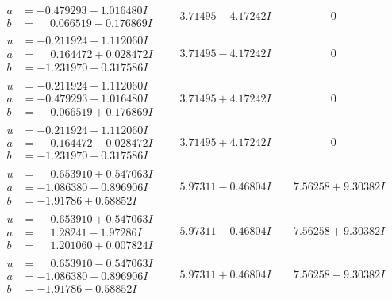 \documentclass[1p]{elsarticle_modified}
\theoremstyle{definition}
\begin{document}
$$\begin{array}{c|c|c}
\begin{aligned}
a &= -0.479293 - 1.016480 I \\
b &= \phantom{-}0.066519 - 0.176869 I\end{aligned}
 & \phantom{-}3.71495 - 4.17242 I & \phantom{-0.000000 } 0 \\ \hline\begin{aligned}
u &= -0.211924 + 1.112060 I \\
a &= \phantom{-}0.164472 + 0.028472 I \\
b &= -1.231970 + 0.317586 I\end{aligned}
 & \phantom{-}3.71495 - 4.17242 I & \phantom{-0.000000 } 0 \\ \hline\begin{aligned}
u &= -0.211924 - 1.112060 I \\
a &= -0.479293 + 1.016480 I \\
b &= \phantom{-}0.066519 + 0.176869 I\end{aligned}
 & \phantom{-}3.71495 + 4.17242 I & \phantom{-0.000000 } 0 \\ \hline\begin{aligned}
u &= -0.211924 - 1.112060 I \\
a &= \phantom{-}0.164472 - 0.028472 I \\
b &= -1.231970 - 0.317586 I\end{aligned}
 & \phantom{-}3.71495 + 4.17242 I & \phantom{-0.000000 } 0 \\ \hline\begin{aligned}
u &= \phantom{-}0.653910 + 0.547063 I \\
a &= -1.086380 + 0.896906 I \\
b &= -1.91786 + 0.58852 I\end{aligned}
 & \phantom{-}5.97311 - 0.46804 I & \phantom{-}7.56258 + 9.30382 I \\ \hline\begin{aligned}
u &= \phantom{-}0.653910 + 0.547063 I \\
a &= \phantom{-}1.28241 - 1.97286 I \\
b &= \phantom{-}1.201060 + 0.007824 I\end{aligned}
 & \phantom{-}5.97311 - 0.46804 I & \phantom{-}7.56258 + 9.30382 I \\ \hline\begin{aligned}
u &= \phantom{-}0.653910 - 0.547063 I \\
a &= -1.086380 - 0.896906 I \\
b &= -1.91786 - 0.58852 I\end{aligned}
 & \phantom{-}5.97311 + 0.46804 I & \phantom{-}7.56258 - 9.30382 I \\ \hline\begin{aligned}

\end{aligned}
\end{array}$$
\end{document}
